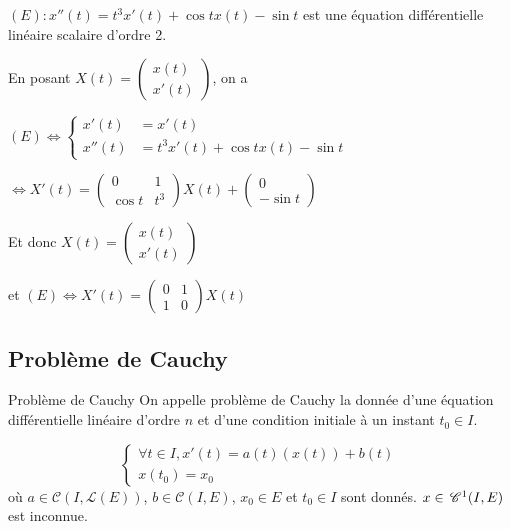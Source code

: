 \begin{exemple}
    $(E) : x''(t) = t^3 x'(t) + \cos t x(t) - \sin t$
    est une équation différentielle linéaire scalaire d'ordre 2. 

    En posant $X(t) = \begin{pmatrix}
        x(t) \\ x'(t)
     \end{pmatrix}$, on a 

     $(E) \Leftrightarrow \begin{cases}
        x'(t) & = x'(t) \\
        x''(t) & = t^3 x'(t) + \cos t x(t) - \sin t
     \end{cases}$

     $\Leftrightarrow X'(t) = \begin{pmatrix}
        0 & 1 \\
        \cos t & t^3
        \end{pmatrix} X(t) + \begin{pmatrix}
        0 \\ -\sin t
     \end{pmatrix}$

    Et donc $X(t) = \begin{pmatrix}
        x(t) \\ x'(t)
     \end{pmatrix}$ 

     et $(E) \Leftrightarrow X'(t) = \begin{pmatrix}
        0 & 1 \\
        1 & 0 \end{pmatrix} X(t) $
\end{exemple}

\subsection{Problème de Cauchy}

\begin{definition}{Problème de Cauchy}{}
    On appelle problème de Cauchy la donnée d'une équation différentielle linéaire d'ordre $n$ et 
    d'une condition initiale à un instant $t_0 \in I$. 
\end{definition}


\svspace $$\begin{cases}
    \forall t \in I, x'(t) = a(t)(x(t)) + b(t) \\
    x(t_0) = x_0
\end{cases}$$
où $a \in \mathscr C(I, \mathscr L(E))$, $b \in \mathscr C(I, E)$, $x_0 \in E$
et $t_0 \in I$ sont donnés. $x \in \,\mathscr C^{1} (I, E)$ est inconnue.

